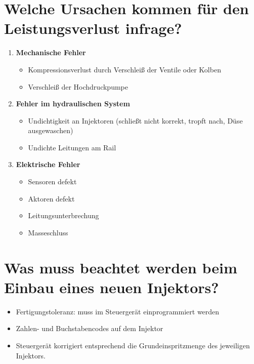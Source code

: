 \section{Welche Ursachen kommen für den Leistungsverlust
infrage?}\label{welche-ursachen-kommen-fuer-den-leistungsverlust-infrage}

\begin{enumerate}
\item
  \textbf{Mechanische Fehler}

  \begin{itemize}
  \item
    Kompressionsverlust durch Verschleiß der Ventile oder Kolben
  \item
    Verschleiß der Hochdruckpumpe
  \end{itemize}
\item
  \textbf{Fehler im hydraulischen System}

  \begin{itemize}
  \item
    Undichtigkeit an Injektoren (schließt nicht korrekt, tropft nach,
    Düse ausgewaschen)
  \item
    Undichte Leitungen am Rail
  \end{itemize}
\item
  \textbf{Elektrische Fehler}

  \begin{itemize}
  \item
    Sensoren defekt
  \item
    Aktoren defekt
  \item
    Leitungsunterbrechung
  \item
    Masseschluss
  \end{itemize}
\end{enumerate}

\section{Was muss beachtet werden beim Einbau eines neuen
Injektors?}\label{was-muss-beachtet-werden-beim-einbau-eines-neuen-injektors}

\begin{itemize}
\item
  Fertigungstoleranz: muss im Steuergerät einprogrammiert werden
\item
  Zahlen- und Buchstabencodes auf dem Injektor
\item
  Steuergerät korrigiert entsprechend die Grundeinspritzmenge des
  jeweiligen Injektors.
\end{itemize}


